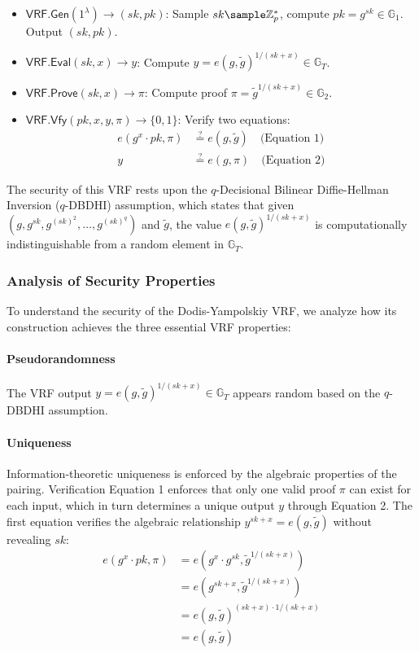\begin{itemize}
    \item $\mathsf{VRF.Gen}(1^\lambda) \to (sk, pk)$: Sample $sk \sample \mathbb{Z}_p^*$, compute $pk = g^{sk} \in \mathbb{G}_1$. Output $(sk, pk)$.
    
    \item $\mathsf{VRF.Eval}(sk, x) \to y$: Compute $y = e(g, \tilde{g})^{1/(sk + x)} \in \mathbb{G}_T$.
    
    \item $\mathsf{VRF.Prove}(sk, x) \to \pi$: Compute proof $\pi = \tilde{g}^{1/(sk + x)} \in \mathbb{G}_2$.
    
    \item $\mathsf{VRF.Vfy}(pk, x, y, \pi) \to \{0, 1\}$: Verify two equations:
    \begin{align}
        e(g^{x} \cdot pk, \pi) &\stackrel{?}{=} e(g, \tilde{g}) \quad \text{(Equation 1)}\\
        y &\stackrel{?}{=} e(g, \pi) \quad \text{(Equation 2)}
    \end{align}
\end{itemize}

The security of this VRF rests upon the $q$-Decisional Bilinear Diffie-Hellman Inversion ($q$-DBDHI) assumption, which states that given $(g, g^{sk}, g^{(sk)^2}, \ldots, g^{(sk)^q})$ and $\tilde{g}$, the value $e(g, \tilde{g})^{1/(sk+x)}$ is computationally indistinguishable from a random element in $\mathbb{G}_T$.

\subsubsection{Analysis of Security Properties}

To understand the security of the Dodis-Yampolskiy VRF, we analyze how its construction achieves the three essential VRF properties:

\paragraph{Pseudorandomness}
The VRF output $y = e(g, \tilde{g})^{1/(sk + x)} \in \mathbb{G}_T$ appears random based on the $q$-DBDHI assumption.

\paragraph{Uniqueness}
Information-theoretic uniqueness is enforced by the algebraic properties of the pairing. 
Verification Equation 1 enforces that only one valid proof $\pi$ can exist for each input, which in turn determines a unique output $y$ through Equation 2. The first equation verifies the algebraic relationship $y^{sk+x} = e(g, \tilde{g})$ without revealing $sk$:
\begin{align}
    e(g^{x} \cdot pk, \pi) &= e(g^{x} \cdot g^{sk}, \tilde{g}^{1/(sk + x)}) \\
    &= e(g^{sk + x}, \tilde{g}^{1/(sk + x)}) \\
    &= e(g, \tilde{g})^{(sk + x) \cdot 1/(sk + x)} \\
    &= e(g, \tilde{g})
\end{align}

